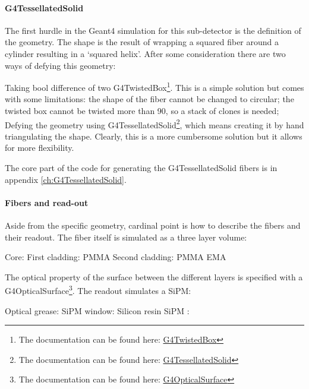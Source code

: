 \begin{refsection}
        \paragraph{G4TessellatedSolid} The first hurdle in the Geant4 simulation for this sub-detector is the definition of the geometry. 
        The shape is the result of wrapping a squared fiber around a cylinder resulting in a `squared helix'.
        After some consideration there are two ways of defying this geometry:
        \begin{outline}
            \1 Taking bool difference of two G4TwistedBox\footnote{The documentation can be found here: \href{https://apc.u-paris.fr/~franco/g4doxy/html/classG4TwistedBox.html}{G4TwistedBox}}. 
            This is a simple solution but comes with some limitations: the shape of the fiber cannot be changed to circular; the twisted box cannot be twisted more than \SI{90}{\deg}, so a stack of clones is needed; 
            \1 Defying the geometry using G4TessellatedSolid\footnote{The documentation can be found here: \href{https://apc.u-paris.fr/~franco/g4doxy/html/classG4TessellatedSolid.html}{G4TessellatedSolid}}, which means creating it by hand triangulating the shape. Clearly, this is a more cumbersome solution but it allows for more flexibility.
        \end{outline}
        The core part of the code for generating the G4TessellatedSolid fibers is in appendix \ref{ch:G4TessellatedSolid}.

        \paragraph{Fibers and read-out} Aside from the specific geometry, cardinal point is how to describe the fibers and their readout. 
        The fiber itself is simulated as a three layer volume:
        \begin{outline}
            \1 Core: 
            \1 First cladding: PMMA
            \1 Second cladding: PMMA EMA
        \end{outline}
        The optical property of the surface between the different layers is specified with a G4OpticalSurface\footnote{The documentation can be found here: \href{https://apc.u-paris.fr/~franco/g4doxy/html/classG4OpticalSurface.html}{G4OpticalSurface}}.
        The readout simulates a SiPM:
        \begin{outline}
            \1 Optical grease: 
            \1 SiPM window: Silicon resin
            \1 SiPM :
        \end{outline}


\end{refsection}
